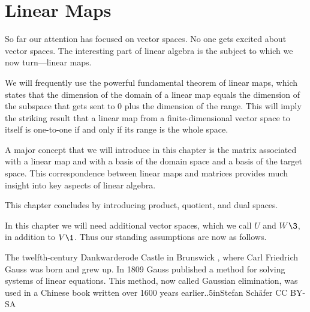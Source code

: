 
\chapter{Linear Maps} \label{LinearMaps} %

So far our attention has focused on vector spaces.  No one gets excited about vector spaces.  The interesting part of linear algebra is the subject to which we now turn---linear maps.

We will frequently use the powerful fundamental theorem of linear maps, which states that the dimension of the domain of a linear map equals the dimension of the subspace that gets sent to $0$ plus the dimension of the range. This will imply the striking result that a linear map from a finite-dimensional vector space to itself is one-to-one if and only if its range is the whole space.

A major concept that we will introduce in this chapter is the matrix associated with a linear map and with a basis of the domain space and a basis of the target space. This correspondence between linear maps and matrices provides much insight into key aspects of linear algebra.

This chapter concludes by introducing product, quotient, and dual spaces.

In this chapter we will need additional vector spaces, which we call $U$ and $W\3$, in addition to $V\1$. Thus our standing assumptions are now as follows.

%
{The twelfth-century Dankwarderode Castle in Brunswick , where Carl Friedrich Gauss  was born and grew up. In 1809 Gauss published a method for solving systems of linear equations. This method, now called Gaussian elimination, was used in a Chinese book written over 1600 years earlier.}{.5in}{Stefan Schäfer CC BY-SA}

